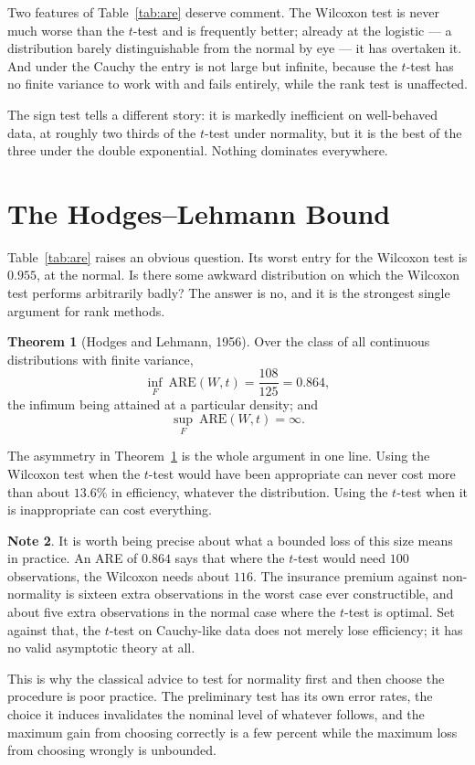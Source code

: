 \documentclass[12pt,a4paper]{report}
\theoremstyle{definition}
\newtheorem{thm}{Theorem}[section]
\newtheorem{note}[thm]{Note}
\theoremstyle{plain}
\begin{document}
Two features of Table~\ref{tab:are} deserve comment. The Wilcoxon test is never
much worse than the $t$-test and is frequently better; already at the logistic
--- a distribution barely distinguishable from the normal by eye --- it has
overtaken it. And under the Cauchy the entry is not large but infinite, because
the $t$-test has no finite variance to work with and fails entirely, while the
rank test is unaffected.

The sign test tells a different story: it is markedly inefficient on
well-behaved data, at roughly two thirds of the $t$-test under normality, but it
is the best of the three under the double exponential. Nothing dominates
everywhere.

\section{The Hodges--Lehmann Bound}

Table~\ref{tab:are} raises an obvious question. Its worst entry for the Wilcoxon
test is $0.955$, at the normal. Is there some awkward distribution on which the
Wilcoxon test performs arbitrarily badly? The answer is no, and it is the
strongest single argument for rank methods.

\begin{thm}[Hodges and Lehmann, 1956]
\label{thm:hl}
Over the class of all continuous distributions with finite variance,
$$\inf_{F}\ \mathrm{ARE}(W,t) = \frac{108}{125} = 0.864 ,$$
the infimum being attained at a particular density; and
$$\sup_{F}\ \mathrm{ARE}(W,t) = \infty .$$
\end{thm}

The asymmetry in Theorem~\ref{thm:hl} is the whole argument in one line. Using
the Wilcoxon test when the $t$-test would have been appropriate can never cost
more than about $13.6\%$ in efficiency, whatever the distribution. Using the
$t$-test when it is inappropriate can cost everything.

\begin{note}
It is worth being precise about what a bounded loss of this size means in
practice. An ARE of $0.864$ says that where the $t$-test would need $100$
observations, the Wilcoxon needs about $116$. The insurance premium against
non-normality is sixteen extra observations in the worst case ever
constructible, and about five extra observations in the normal case where the
$t$-test is optimal. Set against that, the $t$-test on Cauchy-like data does not
merely lose efficiency; it has no valid asymptotic theory at all.

This is why the classical advice to test for normality first and then choose the
procedure is poor practice. The preliminary test has its own error rates, the
choice it induces invalidates the nominal level of whatever follows, and the
maximum gain from choosing correctly is a few percent while the maximum loss
from choosing wrongly is unbounded.
\end{note}
\end{document}
